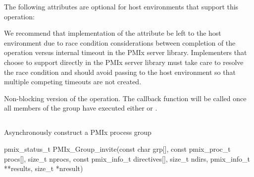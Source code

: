 \optattrstart
The following attributes are optional for host environments that support this operation:


\optattrend

\adviceimplstart
We recommend that implementation of the  attribute be left to the host environment due to race condition considerations between completion of the operation versus internal timeout in the \ac{PMIx} server library. Implementers that choose to support  directly in the \ac{PMIx} server library must take care to resolve the race condition and should avoid passing  to the host environment so that multiple competing timeouts are not created.
\adviceimplend


\descr

Non-blocking version of the  operation. The callback function will be called once all members of the group have executed either  or .

\subsection{}

\summary

Asynchronously construct a \ac{PMIx} process group

\format

\cspecificstart
\begin{codepar}
pmix_status_t
PMIx_Group_invite(const char grp[],
                  const pmix_proc_t procs[], size_t nprocs,
                  const pmix_info_t directives[], size_t ndirs,
                  pmix_info_t **results, size_t *nresult)
\end{codepar}
\cspecificend

\begin{arglist}
\end{arglist}

